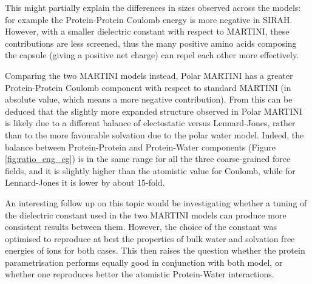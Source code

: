This might partially explain the differences in sizes observed across the models: for example the Protein-Protein Coulomb energy is more negative in SIRAH. However, with a smaller dielectric constant with respect to MARTINI, these contributions are less screened, thus the many positive amino acids composing the capsule (giving a positive net charge) can repel each other more effectively.

Comparing the two MARTINI models instead, Polar MARTINI has a greater Protein-Protein Coulomb component with respect to standard MARTINI (in absolute value, which means a more negative contribution). From this can be deduced that the slightly more expanded structure observed in Polar MARTINI is likely due to a different balance of electostatic versus Lennard-Jones, rather than to the more favourable solvation due to the polar water model.
%
Indeed, the balance between Protein-Protein and Protein-Water components (Figure \ref{fig:ratio_eng_cg}) is in the same range for all the three coarse-grained force fields, and it is slightly higher than the atomistic value for Coulomb, while for Lennard-Jones it is lower by about 15-fold.

An interesting follow up on this topic would be investigating whether a tuning of the dielectric constant used in the two MARTINI models can produce more consistent results between them. However, the choice of the constant was optimised to reproduce at best the properties of bulk water and solvation free energies of ions for both cases. This then raises the question whether the protein parametrisation performs equally good in conjunction with both model, or whether one reproduces better the atomistic Protein-Water interactions.


